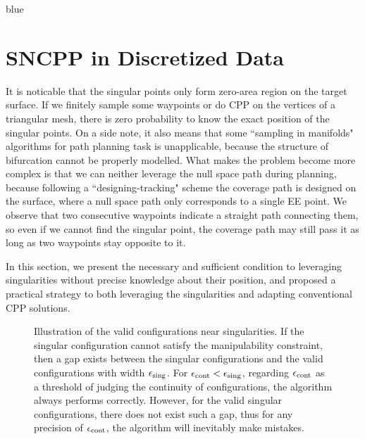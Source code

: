 \documentclass[Afour,sageh,times]{sagej}
\begin{document}
\begin{color}{blue}
\section{SNCPP in Discretized Data}\label{section_discrete}
\end{color}
It is noticable that the singular points only form zero-area region on the target surface. If we finitely sample some waypoints or do CPP on the vertices of a triangular mesh, there is zero probability to know the exact position of the singular points. 
On a side note, it also means that some ``sampling in manifolds" algorithms for path planning task is unapplicable, because the structure of bifurcation cannot be properly modelled. 
What makes the problem become more complex is that we can neither leverage the null space path during planning, because following a ``designing-tracking" scheme the coverage path is designed on the surface, where a null space path only corresponds to a single EE point. 
We observe that two consecutive waypoints indicate a straight path connecting them, so even if we cannot find the singular point, the coverage path may still pass it as long as two waypoints stay opposite to it. 

In this section, we present the necessary and sufficient condition to leveraging singularities without precise knowledge about their position, and proposed a practical strategy to both leveraging the singularities and adapting conventional CPP solutions. 

\begin{figure}[t]
\centering
{}
\caption{Illustration of the valid configurations near singularities. If the singular configuration cannot satisfy the manipulability constraint, then a gap exists between the singular configurations and the valid configurations with width $\epsilon_{\rm sing}$. For $\epsilon_{\rm cont} < \epsilon_{\rm sing}$, regarding $\epsilon_{\rm cont}$ as a threshold of judging the continuity of configurations, the algorithm always performs correctly. However, for the valid singular configurations, there does not exist such a gap, thus for any precision of $\epsilon_{\rm cont}$, the algorithm will inevitably make mistakes.
}\label{fig:gap}
\end{figure}
\end{document}

